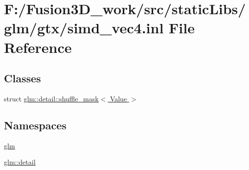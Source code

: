 \hypertarget{simd__vec4_8inl}{}\section{F\+:/\+Fusion3\+D\+\_\+work/src/static\+Libs/glm/gtx/simd\+\_\+vec4.inl File Reference}
\label{simd__vec4_8inl}
\subsection*{Classes}
\begin{DoxyCompactItemize}
\item 
struct \hyperlink{structglm_1_1detail_1_1shuffle__mask}{glm\+::detail\+::shuffle\+\_\+mask$<$ Value $>$}
\end{DoxyCompactItemize}
\subsection*{Namespaces}
\begin{DoxyCompactItemize}
\item 
 \hyperlink{namespaceglm}{glm}
\item 
 \hyperlink{namespaceglm_1_1detail}{glm\+::detail}
\end{DoxyCompactItemize}
